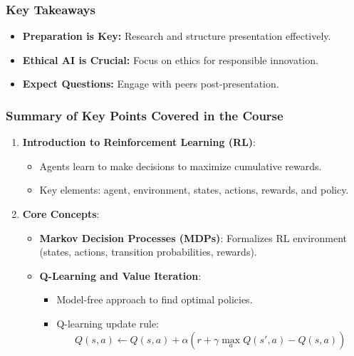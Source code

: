 \documentclass[aspectratio=169]{beamer}
\begin{document}
\begin{frame}[fragile]
    \frametitle{Key Takeaways}
    \begin{itemize}
        \item \textbf{Preparation is Key:} Research and structure presentation effectively.
        \item \textbf{Ethical AI is Crucial:} Focus on ethics for responsible innovation.
        \item \textbf{Expect Questions:} Engage with peers post-presentation.
    \end{itemize}
\end{frame}

\begin{frame}[fragile]
    \frametitle{Summary of Key Points Covered in the Course}
    \begin{enumerate}
        \item \textbf{Introduction to Reinforcement Learning (RL)}:
        \begin{itemize}
            \item Agents learn to make decisions to maximize cumulative rewards.
            \item Key elements: agent, environment, states, actions, rewards, and policy.
        \end{itemize}
        
        \item \textbf{Core Concepts}:
        \begin{itemize}
            \item \textbf{Markov Decision Processes (MDPs)}: Formalizes RL environment (states, actions, transition probabilities, rewards).
            \item \textbf{Q-Learning and Value Iteration}:
            \begin{itemize}
                \item Model-free approach to find optimal policies.
                \item Q-learning update rule:
                \begin{equation}
                    Q(s, a) \leftarrow Q(s, a) + \alpha \left( r + \gamma \max_a Q(s', a) - Q(s, a) \right)
                \end{equation}
            \end{itemize}
        \end{itemize}
    \end{enumerate}
\end{frame}
\end{document}
